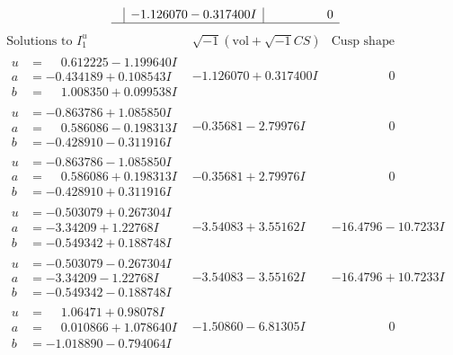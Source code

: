 \documentclass[1p]{elsarticle_modified}
\theoremstyle{definition}
\newcommand{\I}{\sqrt{-1}}
\begin{document}
$$\begin{array}{c|c|c}
 & -1.126070 - 0.317400 I & \phantom{-0.000000 } 0\\
 \hline 
 \end{array}$$\newpage$$\begin{array}{c|c|c}  
\text{Solutions to }I^u_{1}& \I (\text{vol} + \sqrt{-1}CS) & \text{Cusp shape}\\
 \hline 
\begin{aligned}
u &= \phantom{-}0.612225 - 1.199640 I \\
a &= -0.434189 + 0.108543 I \\
b &= \phantom{-}1.008350 + 0.099538 I\end{aligned}
 & -1.126070 + 0.317400 I & \phantom{-0.000000 } 0 \\ \hline\begin{aligned}
u &= -0.863786 + 1.085850 I \\
a &= \phantom{-}0.586086 - 0.198313 I \\
b &= -0.428910 - 0.311916 I\end{aligned}
 & -0.35681 - 2.79976 I & \phantom{-0.000000 } 0 \\ \hline\begin{aligned}
u &= -0.863786 - 1.085850 I \\
a &= \phantom{-}0.586086 + 0.198313 I \\
b &= -0.428910 + 0.311916 I\end{aligned}
 & -0.35681 + 2.79976 I & \phantom{-0.000000 } 0 \\ \hline\begin{aligned}
u &= -0.503079 + 0.267304 I \\
a &= -3.34209 + 1.22768 I \\
b &= -0.549342 + 0.188748 I\end{aligned}
 & -3.54083 + 3.55162 I & -16.4796 - 10.7233 I \\ \hline\begin{aligned}
u &= -0.503079 - 0.267304 I \\
a &= -3.34209 - 1.22768 I \\
b &= -0.549342 - 0.188748 I\end{aligned}
 & -3.54083 - 3.55162 I & -16.4796 + 10.7233 I \\ \hline\begin{aligned}
u &= \phantom{-}1.06471 + 0.98078 I \\
a &= \phantom{-}0.010866 + 1.078640 I \\
b &= -1.018890 - 0.794064 I\end{aligned}
 & -1.50860 - 6.81305 I & \phantom{-0.000000 } 0 \\ \hline\begin{aligned}

\end{aligned}
\end{array}$$
\end{document}
